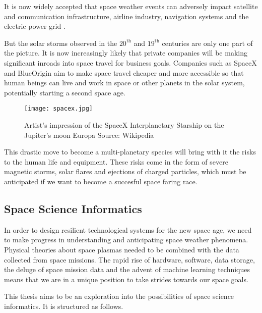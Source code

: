 It is now widely accepted that space weather events can adversely impact satellite and communication infrastructure, 
airline industry, navigation systems and the electric power grid 
\citep{board2009severe,cannon2013extreme,bothmer2007space,baker2004effects}.

But the solar storms observed in the $20^{\text{th}}$ and $19^{\text{th}}$ centuries are only one part of the 
picture. It is now increasingly likely that private companies will be making significant inroads into space 
travel for business goals. Companies such as SpaceX and BlueOrigin aim to make space travel cheaper and more 
accessible so that human beings can live and work in space or other planets in the solar system, potentially 
starting a second space age.


\begin{wrapfigure}{l}{0.4\textwidth}
    \centering\texttt{[image: spacex.jpg]}
    \caption{
        \small Artist's impression of the SpaceX Interplanetary Starship on the Jupiter's moon Europa Source: Wikipedia}
    \label{fig:spacex}
\end{wrapfigure}

This drastic move to become a multi-planetary species will bring with it the risks to the human life and equipment. 
These risks come in the form of severe magnetic storms, solar flares and ejections of charged particles, which must 
be anticipated if we want to become a succesful space faring race. 

\subsection*{Space Science Informatics}

In order to design resilient technological systems for the new space age, we need to make progress in understanding 
and anticipating space weather phenomena. Physical theories about space plasmas needed to be combined with the data 
collected from space missions. The rapid rise of hardware, software, data storage, the deluge of space mission data 
and the advent of machine learning techniques means that we are in a unique position to take strides towards our 
space goals.

This thesis aims to be an exploration into the possibilities of space science informatics. It is structured as follows.

